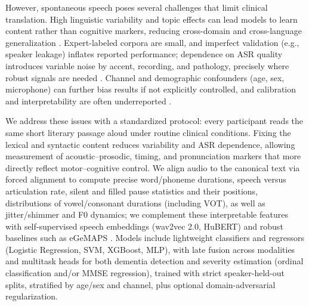 \documentclass{article}
\begin{document}
However, spontaneous speech poses several challenges that limit clinical translation. High linguistic variability and topic effects can lead models to learn content rather than cognitive markers, reducing cross-domain and cross-language generalization \citep{review2020,adress2020}. Expert-labeled corpora are small, and imperfect validation (e.g., speaker leakage) inflates reported performance; dependence on ASR quality introduces variable noise by accent, recording, and pathology, precisely where robust signals are needed \citep{review2020,adresso2021}. Channel and demographic confounders (age, sex, microphone) can further bias results if not explicitly controlled, and calibration and interpretability are often underreported \citep{adress2020,adresso2021,review2020}.

We address these issues with a standardized protocol: every participant reads the same short literary passage aloud under routine clinical conditions. Fixing the lexical and syntactic content reduces variability and ASR dependence, allowing measurement of acoustic–prosodic, timing, and pronunciation markers that more directly reflect motor–cognitive control. We align audio to the canonical text via forced alignment to compute precise word/phoneme durations, speech versus articulation rate, silent and filled pause statistics and their positions, distributions of vowel/consonant durations (including VOT), as well as jitter/shimmer and F0 dynamics; we complement these interpretable features with self-supervised speech embeddings (wav2vec 2.0, HuBERT) and robust baselines such as eGeMAPS \citep{gemaps2015,mfa,ssl_alzheimers}. Models include lightweight classifiers and regressors (Logistic Regression, SVM, XGBoost, MLP), with late fusion across modalities and multitask heads for both dementia detection and severity estimation (ordinal classification and/or MMSE regression), trained with strict speaker-held-out splits, stratified by age/sex and channel, plus optional domain-adversarial regularization.
\end{document}
